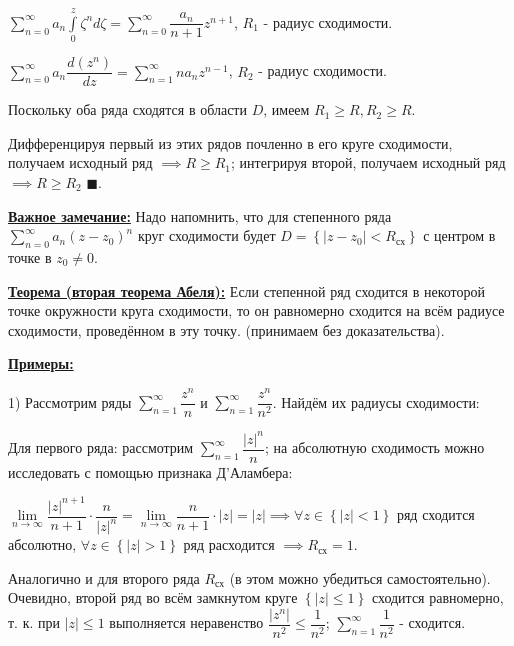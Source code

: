 \documentclass[a4paper, 12pt]{article}
\begin{document}
  \begin{center}
    $\displaystyle\sum\limits_{n=0}^{\infty} a_n \displaystyle\int\limits_{0}^{z}\zeta^n d\zeta = \displaystyle\sum\limits_{n=0}^{\infty} \dfrac{a_n}{n+1} z^{n+1}$, $R_1$ - радиус сходимости. 
  
    $\displaystyle\sum\limits_{n=0}^{\infty} a_n \dfrac{d(z^n)}{dz} = \displaystyle\sum\limits_{n=1}^{\infty} na_n z^{n-1}$, $R_2$ - радиус сходимости. 
  \end{center}

  \quad Поскольку оба ряда сходятся в области $D$, имеем $R_1 \geq R, R_2 \geq R$. 

  \quad Дифференцируя первый из этих рядов почленно в его круге сходимости, получаем исходный ряд $\implies R \geq R_1$; интегрируя второй, получаем исходный ряд $\implies R \geq R_2$ $\blacksquare$.

  \quad \textbf{\underline{Важное замечание:}} Надо напомнить, что для степенного ряда $ \displaystyle\sum\limits_{n=0}^{\infty} a_n (z-z_0)^n $ круг сходимости будет $D = \left\{ |z-z_0| < R_{\text{сх}} \right\}$ с центром в точке в $z_0 \neq 0$. 

  \quad \textbf{\underline{Теорема (вторая теорема Абеля):}} Если степенной ряд сходится в некоторой точке окружности круга сходимости, то он равномерно сходится на всём радиусе сходимости, проведённом в эту точку. (принимаем без доказательства). 

  \quad \textbf{\underline{Примеры:}}

  1) Рассмотрим ряды $\displaystyle\sum\limits_{n=1}^{\infty} \dfrac{z^n}{n}$ и $\displaystyle\sum\limits_{n=1}^{\infty} \dfrac{z^n}{n^2}$. Найдём их радиусы сходимости:

  \quad Для первого ряда: рассмотрим $\displaystyle\sum\limits_{n=1}^{\infty} \dfrac{|z|^n}{n}$; на абсолютную сходимость можно исследовать с помощью признака Д'Аламбера:

  \begin{center}
    $\lim\limits_{n \to \infty} \dfrac{|z|^{n+1}}{n+1} \cdot \dfrac{n}{|z|^n} = \lim\limits_{n \to \infty} \dfrac{n}{n+1} \cdot |z|  = |z| \implies \forall z \in \left\{ |z| < 1 \right\}$ ряд сходится абсолютно, $\forall z \in \left\{ |z| > 1 \right\}$ ряд расходится $\implies R_{\text{сх}} = 1$. 
  \end{center}

  \quad Аналогично и для второго ряда $R_{\text{сх}}$ (в этом можно убедиться самостоятельно). Очевидно, второй ряд во всём замкнутом круге $\left\{ |z| \leq 1 \right\}$ сходится равномерно, т. к. при $|z| \leq 1$ выполняется неравенство $\dfrac{|z^n|}{n^2} \leq \dfrac{1}{n^2}$; $\displaystyle\sum\limits_{n=1}^{\infty} \dfrac{1}{n^2}$ - сходится. 
\end{document}
